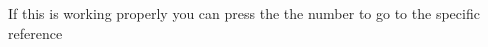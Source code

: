 \documentclass{article}
\begin{document}
\nocite{*}
If this is working properly you can press the the number to go to the specific reference









\end{document}
